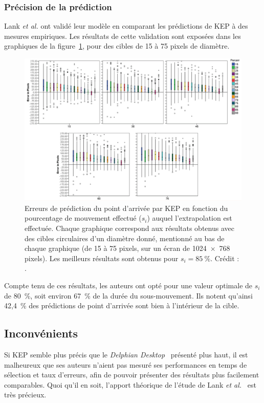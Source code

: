 	\subsubsection{Précision de la prédiction}
	Lank \emph{et al.} ont validé leur modèle en comparant les prédictions de KEP à des mesures empiriques. Les résultats de cette validation sont exposées dans les graphiques de la figure~\ref{fig:kepErrors}, pour des cibles de 15 à 75 pixels de diamètre.
	
	\begin{figure}[H]
		\centering
		\includegraphics[width=\textwidth]{figures/ch2/kepErrors}
		\caption[KEP -- erreurs de prédiction]{Erreurs de prédiction du point d'arrivée par KEP en fonction du pourcentage de mouvement effectué ($s_{i}$) auquel l'extrapolation est effectuée. Chaque graphique correspond aux résultats obtenus avec des cibles circulaires d'un diamètre donné, mentionné au bas de chaque graphique (de 15 à 75 pixels, sur un écran de 1024~$\times$~768 pixels). Les meilleurs résultats sont obtenus pour $s_{i} = 85~\%{}$. Crédit : \cite{lank2007endpoint}.}
		\label{fig:kepErrors}
	\end{figure}
	
	Compte tenu de ces résultats, les auteurs ont opté pour une valeur optimale de $s_{i}$ de 80~\%{}, soit environ 67~\%{} de la durée du sous-mouvement. Ils notent qu'ainsi 42,4~\%{} des prédictions de point d'arrivée sont bien à l'intérieur de la cible.	
	
	\subsection{Inconvénients}
	Si KEP semble plus précis que le \emph{Delphian Desktop}~\cite{asano2005predictive} présenté plus haut, il est malheureux que ses auteurs n'aient pas mesuré ses performances en temps de sélection et taux d'erreurs, afin de pouvoir présenter des résultats plus facilement comparables. Quoi qu'il en soit, l'apport théorique de l'étude de Lank \emph{et al.}~\cite{lank2007endpoint} est très précieux.
	
